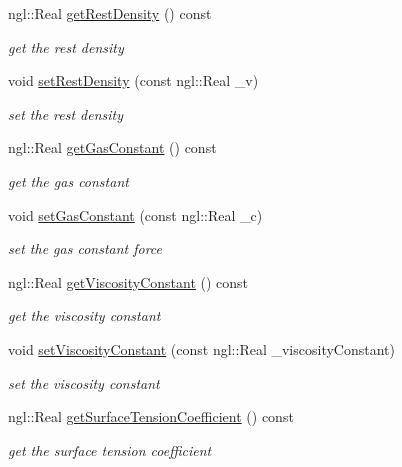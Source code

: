 \begin{DoxyCompactItemize}
ngl::Real \hyperlink{class_fluid_particle_a80daf1a3c8c36559e4f28a5240ecca50}{getRestDensity} () const 
\begin{DoxyCompactList}\small\item\em get the rest density \item\end{DoxyCompactList}\item 
void \hyperlink{class_fluid_particle_a85333cc69cb0731330186c6a88c2ac37}{setRestDensity} (const ngl::Real \_\-v)
\begin{DoxyCompactList}\small\item\em set the rest density \item\end{DoxyCompactList}\item 
ngl::Real \hyperlink{class_fluid_particle_ac9c1822921c77438883a033200243530}{getGasConstant} () const 
\begin{DoxyCompactList}\small\item\em get the gas constant \item\end{DoxyCompactList}\item 
void \hyperlink{class_fluid_particle_a814b73436943fccc64939d1dc1c1945d}{setGasConstant} (const ngl::Real \_\-c)
\begin{DoxyCompactList}\small\item\em set the gas constant force \item\end{DoxyCompactList}\item 
ngl::Real \hyperlink{class_fluid_particle_abff9703a289af1a52f478462bb92a4c3}{getViscosityConstant} () const 
\begin{DoxyCompactList}\small\item\em get the viscosity constant \item\end{DoxyCompactList}\item 
void \hyperlink{class_fluid_particle_aedde7e367011a2e11849442462085b6c}{setViscosityConstant} (const ngl::Real \_\-viscosityConstant)
\begin{DoxyCompactList}\small\item\em set the viscosity constant \item\end{DoxyCompactList}\item 
ngl::Real \hyperlink{class_fluid_particle_a5a4b8fee5183ee621b23f83644bfe434}{getSurfaceTensionCoefficient} () const 
\begin{DoxyCompactList}\small\item\em get the surface tension coefficient \item\end{DoxyCompactList}\item 

\end{DoxyCompactItemize}
